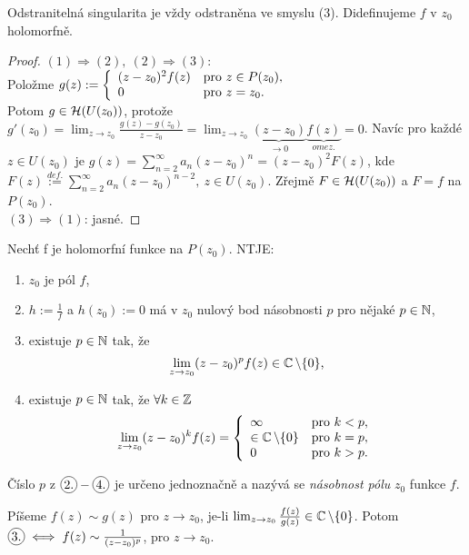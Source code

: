 \begin{agreement}
Odstranitelná singularita je vždy odstraněna ve smyslu (3). Didefinujeme $f$ v $z_0$ holomorfně.
\end{agreement}
\begin{proof}
$(1)\Rightarrow(2),\ (2)\Rightarrow(3)$:\\
Položme $g(z):=\left\{ \begin{array}{ll} (z-z_0)^2f(z) & \mbox{pro } z\in P(z_0), \\ 0 & \mbox{pro } z=z_0. \end{array} \right.$\\ 
Potom $g\in \operatorname{\mathcal{H}}(U(z_0))$, protože $g'(z_0)=\lim_{z\rightarrow z_0}\frac{g(z)-g(z_0)}{z-z_0}=\lim_{z\rightarrow z_0}\underbrace{(z-z_0)}_{\rightarrow0}\underbrace{f(z)}_{omez.}=0$.
Navíc pro každé $z\in U(z_0)$ je $g(z)=\sum_{n=2}^{\infty}a_n(z-z_0)^n=(z-z_0)^2F(z)$, kde $F(z)\stackrel{def.}{:=}\sum_{n=2}^{\infty}a_n(z-z_0)^{n-2},\ z\in U(z_0)$. Zřejmě $F\in\operatorname{\mathcal{H}}(U(z_0))$ a $F=f$ na $P(z_0)$.\\
$(3)\Rightarrow(1)$: jasné.
\end{proof}
\begin{theorem}[O pólu] Nechť f je holomorfní funkce na $P(z_0)$. NTJE:
\begin{enumerate}
    \item $z_0$ je pól $f$,
    \item $h:=\frac{1}{f}$ a $h(z_0):=0$ má v $z_0$ nulový bod násobnosti $p$ pro nějaké $p\in\operatorname{\mathbb{N}}$,
    \item existuje $p\in\operatorname{\mathbb{N}}$ tak, že $$\lim_{z\rightarrow z_0}(z-z_0)^pf(z)\in\operatorname{\mathbb{C}}\setminus\{0\}\text{,}$$
    \item existuje $p\in \operatorname{\mathbb{N}}$ tak, že $\forall k\in\operatorname{\mathbb{Z}}$ $$\lim_{z\rightarrow z_0}(z-z_0)^kf(z)=\left\{ \begin{array}{lll} \infty & \mbox{pro } k<p, \\ \in\operatorname{\mathbb{C}}\setminus\{0\} & \mbox{pro } k=p, \\ 0 & \mbox{pro } k>p. \end{array} \right.$$
\end{enumerate}
Číslo $p$ z $\circled{2.} - \circled{4.}$ je určeno jednoznačně a nazývá se \emph{násobnost pólu} $z_0$ funkce $f$.
\end{theorem}

\begin{note}
Píšeme $f(z)\sim g(z)$ pro $z\rightarrow z_0$, je-li $\lim_{z\rightarrow z_0}\frac{f(z)}{g(z)}\in\operatorname{\mathbb{C}}\setminus\{0\}$. Potom $\circled{3.}\iff f(z)\sim\frac{1}{(z-z_0)^p}$, pro $z\rightarrow z_0$.
\end{note} 

